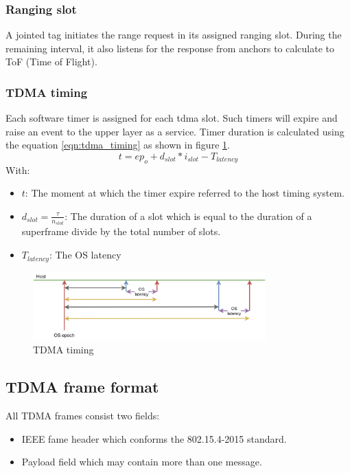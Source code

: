 \documentclass[\main/main.tex]{subfiles}
\begin{document}
\subsubsection{Ranging slot}
A jointed tag initiates the range request in its assigned ranging slot. During the remaining interval, it also listens for the response from anchors to calculate to ToF (Time of Flight).

\subsubsection{TDMA timing}
Each software timer is assigned for each tdma slot. Such timers will expire and raise an event to the upper layer as a service. Timer duration is calculated using the equation \ref{eqn:tdma_timing} as shown in figure \ref{fig:tdma_timing}.
\begin{equation}
    t = ep_o + d_{slot}*i_{slot} - T_{latency}
    \label{eqn:tdma_timing}
\end{equation}
With: 
\begin{itemize}
    \item $t$: The moment at which the timer expire referred to the host timing system.
    \item $d_{slot} = \frac{\tau}{n_{slot}}$: The duration of a slot which is equal to the duration of a superframe divide by the total number of slots.
    \item $T_{latency}$: The OS latency
\end{itemize}

\begin{figure}[H]
    \begin{center}
        \includegraphics[width=0.8\textwidth]{tdma_timing.png}
    \end{center}
    \caption{TDMA timing}
    \label{fig:tdma_timing}
\end{figure}


\subsection{TDMA frame format}
All TDMA frames consist two fields:
\begin{itemize}
    \item IEEE fame header which conforms the 802.15.4-2015 standard.
    \item Payload field which may contain more than one message. 
\end{itemize}
\end{document}
